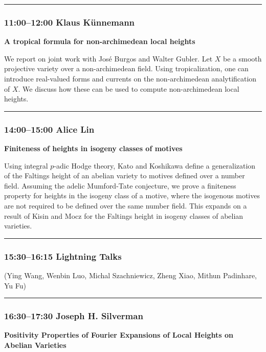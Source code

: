 \documentclass[11pt]{amsart}
\numberwithin{equation}{section}
\begin{document}
\bigskip
\hrule
\bigskip

\subsubsection*{11:00--12:00 \quad Klaus K\"unnemann}

\textbf{A tropical formula for non-archimedean local heights}

We report on joint work with Jos\'e Burgos and Walter Gubler. Let $X$ be a smooth projective variety over a non-archimedean field. Using tropicalization, one can introduce real-valued forms and currents on the non-archimedean analytification of $X$. We discuss how these can be used to compute non-archimedean local heights.

\bigskip
\hrule
\bigskip

\subsubsection*{14:00--15:00 \quad Alice Lin}

\textbf{Finiteness of heights in isogeny classes of motives}

Using integral $p$-adic Hodge theory, Kato and Koshikawa define a generalization of the Faltings height of an abelian variety to motives defined over a number field. Assuming the adelic Mumford-Tate conjecture, we prove a finiteness property for heights in the isogeny class of a motive, where the isogenous motives are not required to be defined over the same number field. This expands on a result of Kisin and Mocz for the Faltings height in isogeny classes of abelian varieties.

\bigskip
\hrule
\bigskip

\subsubsection*{15:30--16:15 \quad Lightning Talks}
(Ying Wang, Wenbin Luo, Michal Szachniewicz, Zheng Xiao, Mithun Padinhare, Yu Fu)
\bigskip
\hrule
\bigskip

\subsubsection*{16:30--17:30 \quad Joseph H. Silverman}

\textbf{Positivity Properties of Fourier Expansions of Local Heights on Abelian Varieties}
\end{document}
